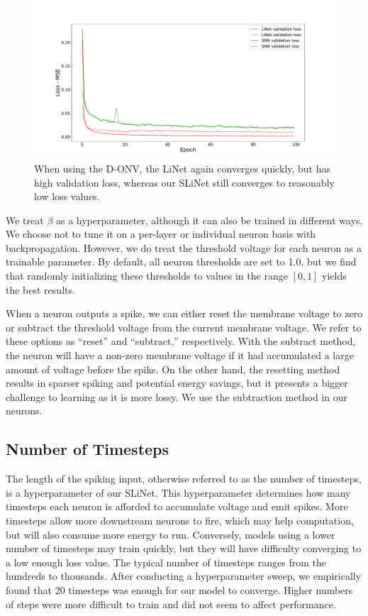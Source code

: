 \documentclass [MS] {UCLAthesis}
\begin{document}
\begin{figure}
    \centering
    \includegraphics[width=\textwidth]{loss_delta}
    \caption[Training and validation loss using D-ONVs]{When using the D-ONV, the LiNet again converges quickly, but has high validation loss, whereas our SLiNet still converges to reasonably low loss values.}
    \label{fig:loss_delta}
\end{figure}

We treat $\beta$ as a hyperparameter, although it can also be trained in different ways. We choose not to tune it on a per-layer or individual neuron basis with backpropagation. However, we do treat the threshold voltage for each neuron as a trainable parameter. By default, all neuron thresholds are set to 1.0, but we find that randomly initializing these thresholds to values in the range $[0,1]$ yields the best results.

When a neuron outputs a spike, we can either reset the membrane voltage to zero or subtract the threshold voltage from the current membrane voltage. We refer to these options as ``reset'' and ``subtract,'' respectively. With the subtract method, the neuron will have a non-zero membrane voltage if it had accumulated a large amount of voltage before the spike. On the other hand, the resetting method results in sparser spiking and potential energy savings, but it presents a bigger challenge to learning as it is more lossy. We use the subtraction method in our neurons.

\subsection{Number of Timesteps}

The length of the spiking input, otherwise referred to as the number of timesteps, is a hyperparameter of our SLiNet. This hyperparameter determines how many timesteps each neuron is afforded to accumulate voltage and emit spikes. More timesteps allow more downstream neurons to fire, which may help computation, but will also consume more energy to run. Conversely, models using a lower number of timesteps may train quickly, but they will have difficulty converging to a low enough loss value. The typical number of timesteps ranges from the hundreds to thousands. After conducting a hyperparameter sweep, we empirically found that 20 timesteps was enough for our model to converge. Higher numbers of steps were more difficult to train and did not seem to affect performance.
\end{document}
